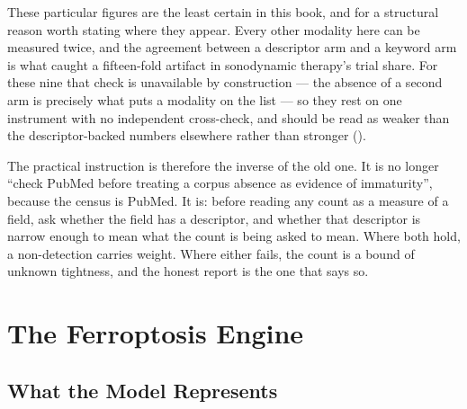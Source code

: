 \documentclass[11pt,twoside,openright]{report}
\begin{document}
These particular figures are the least certain in this book, and for a structural reason worth stating where they appear. Every other modality here can be measured twice, and the agreement between a descriptor arm and a keyword arm is what caught a fifteen-fold artifact in sonodynamic therapy's trial share. For these nine that check is unavailable by construction --- the absence of a second arm is precisely what puts a modality on the list --- so they rest on one instrument with no independent cross-check, and should be read as weaker than the descriptor-backed numbers elsewhere rather than stronger ().

The practical instruction is therefore the inverse of the old one. It is no longer ``check PubMed before treating a corpus absence as evidence of immaturity'', because the census is PubMed. It is: before reading any count as a measure of a field, ask whether the field has a descriptor, and whether that descriptor is narrow enough to mean what the count is being asked to mean. Where both hold, a non-detection carries weight. Where either fails, the count is a bound of unknown tightness, and the honest report is the one that says so.



\chapter{The Ferroptosis Engine}


\section{What the Model Represents}

\end{document}
